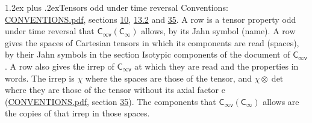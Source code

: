 \documentclass[10pt,a4paper]{article}
\makeatletter
\renewcommand\section{\@startsection{section}{1}{\z@}{-3ex plus -1ex minus -.2ex}%
  {1.2ex plus .2ex}{\normalfont\large\sffamily\bfseries\color{parttitle}}}
\numberwithin{equation}{section}
\newcommand{\grp}[1]{\mathsf{#1}}
\newcommand{\irrprod}{\otimes}
\makeatother
\begin{document}
\section{Tensors odd under time reversal}\label{s:time_odd}
Conventions: \href{../../CONVENTIONS.pdf}{CONVENTIONS.pdf}, sections \href{../../../rotation/CONVENTIONS.pdf\#conv.10}{10}, \href{../../../rotation/CONVENTIONS.pdf\#conv.13.2}{13.2} and \href{../../CONVENTIONS.pdf\#conv.35}{35}.
\leavevmode\label{n:head.name.property}A row is a tensor property odd under time reversal that $\grp{C_{\infty v}}(\grp{C_{\infty}})$ allows, by its Jahn symbol (name). \label{n:head.spaces}A row gives the spaces of Cartesian tensors in which its components are read (spaces), by their Jahn symbols in the section Isotypic components of the document of \href{../../../rotation/data/pdf/Cinfv.pdf}{$\grp{C_{\infty v}}$}. \label{n:head.irrep}\label{n:head.properties}A row also gives the irrep of $\grp{C_{\infty v}}$ at which they are read and the properties in words. The irrep is $\chi$ where the spaces are those of the tensor, and $\chi \irrprod \det$ where they are those of the tensor without its axial factor e (\href{../../CONVENTIONS.pdf}{CONVENTIONS.pdf}, section \href{../../CONVENTIONS.pdf\#conv.35}{35}). The components that $\grp{C_{\infty v}}(\grp{C_{\infty}})$ allows are the copies of that irrep in those spaces.
\end{document}
